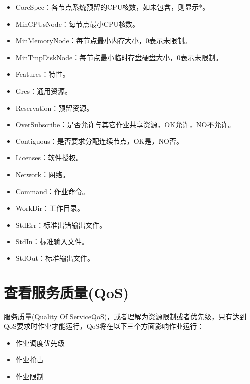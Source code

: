 \documentclass[a4paper,12pt,english]{sphinxmanual}
\begin{document}
\begin{itemize}
\item {} 
\sphinxAtStartPar
CoreSpec：各节点系统预留的CPU核数，如未包含，则显示*。

\item {} 
\sphinxAtStartPar
MinCPUsNode：每节点最小CPU核数。

\item {} 
\sphinxAtStartPar
MinMemoryNode：每节点最小内存大小，0表示未限制。

\item {} 
\sphinxAtStartPar
MinTmpDiskNode：每节点最小临时存盘硬盘大小，0表示未限制。

\item {} 
\sphinxAtStartPar
Features：特性。

\item {} 
\sphinxAtStartPar
Gres：通用资源。

\item {} 
\sphinxAtStartPar
Reservation：预留资源。

\item {} 
\sphinxAtStartPar
OverSubscribe：是否允许与其它作业共享资源，OK允许，NO不允许。

\item {} 
\sphinxAtStartPar
Contiguous：是否要求分配连续节点，OK是，NO否。

\item {} 
\sphinxAtStartPar
Licenses：软件授权。

\item {} 
\sphinxAtStartPar
Network：网络。

\item {} 
\sphinxAtStartPar
Command：作业命令。

\item {} 
\sphinxAtStartPar
WorkDir：工作目录。

\item {} 
\sphinxAtStartPar
StdErr：标准出错输出文件。

\item {} 
\sphinxAtStartPar
StdIn：标准输入文件。

\item {} 
\sphinxAtStartPar
StdOut：标准输出文件。

\end{itemize}


\section{查看服务质量(QoS)}
\label{\detokenize{slurm/slurm:qos}}
\sphinxAtStartPar
服务质量(Quality Of Service\sphinxhyphen{}QoS)，或者理解为资源限制或者优先级，只有达到QoS要求时作业才能运行，QoS将在以下三个方面影响作业运行：
\begin{itemize}
\item {} 
\sphinxAtStartPar
作业调度优先级

\item {} 
\sphinxAtStartPar
作业抢占

\item {} 
\sphinxAtStartPar
作业限制

\end{itemize}
\end{document}
